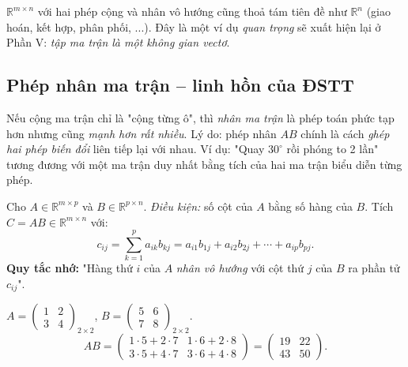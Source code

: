 \documentclass[12pt,a4paper]{article}
\begin{document}
\begin{tinhchat}
$\mathbb{R}^{m\times n}$ với hai phép cộng và nhân vô hướng cũng thoả tám tiên đề như $\mathbb{R}^n$ (giao hoán, kết hợp, phân phối, ...). Đây là một ví dụ \emph{quan trọng} sẽ xuất hiện lại ở Phần V: \emph{tập ma trận là một không gian vectơ}.
\end{tinhchat}

\subsection{Phép nhân ma trận -- linh hồn của ĐSTT}

\begin{dongco}
Nếu cộng ma trận chỉ là "cộng từng ô", thì \emph{nhân ma trận} là phép toán phức tạp hơn nhưng cũng \emph{mạnh hơn rất nhiều}. Lý do: phép nhân $AB$ chính là cách \emph{ghép hai phép biến đổi} liên tiếp lại với nhau. Ví dụ: "Quay $30^\circ$ rồi phóng to 2 lần" tương đương với một ma trận duy nhất bằng tích của hai ma trận biểu diễn từng phép.
\end{dongco}

\begin{dinhnghia}
  Cho $A \in \mathbb{R}^{m \times p}$ và $B \in \mathbb{R}^{p \times n}$. \emph{Điều kiện:} số cột của $A$ bằng số hàng của $B$. Tích $C = AB \in \mathbb{R}^{m \times n}$ với:
  \[
    c_{ij} = \sum_{k=1}^{p} a_{ik} b_{kj} = a_{i1} b_{1j} + a_{i2} b_{2j} + \cdots + a_{ip} b_{pj}.
  \]
  \textbf{Quy tắc nhớ:} "Hàng thứ $i$ của $A$ \emph{nhân vô hướng} với cột thứ $j$ của $B$ ra phần tử $c_{ij}$".
\end{dinhnghia}

\begin{vidu}[title={Tính trực tiếp $AB$}]
$A = \begin{pmatrix}1 & 2\\ 3 & 4\end{pmatrix}_{2\times 2}$, $B = \begin{pmatrix}5 & 6\\ 7 & 8\end{pmatrix}_{2 \times 2}$.
\[
  AB = \begin{pmatrix} 1\cdot 5 + 2\cdot 7 & 1\cdot 6 + 2\cdot 8 \\ 3\cdot 5 + 4 \cdot 7 & 3\cdot 6 + 4\cdot 8\end{pmatrix} = \begin{pmatrix}19 & 22 \\ 43 & 50\end{pmatrix}.
\]
\end{vidu}
\end{document}
